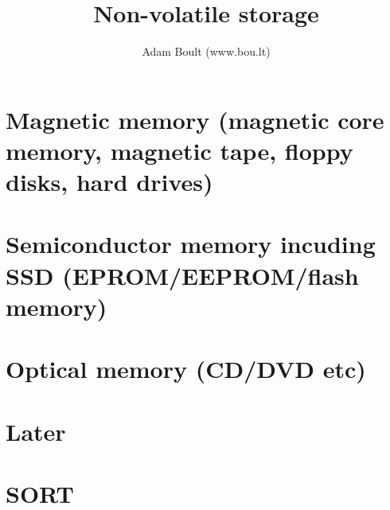 \documentclass[oneside]{book}
\begin{document}
\author{Adam Boult (www.bou.lt)}
\title{Non-volatile storage}
\maketitle

\setcounter{tocdepth}{0}
\tableofcontents



\part{Magnetic memory (magnetic core memory, magnetic tape, floppy disks, hard drives)}

\part{Semiconductor memory incuding SSD (EPROM/EEPROM/flash memory)}


\part{Optical memory (CD/DVD etc)}


\part{Later}





\part{SORT}

\end{document}
